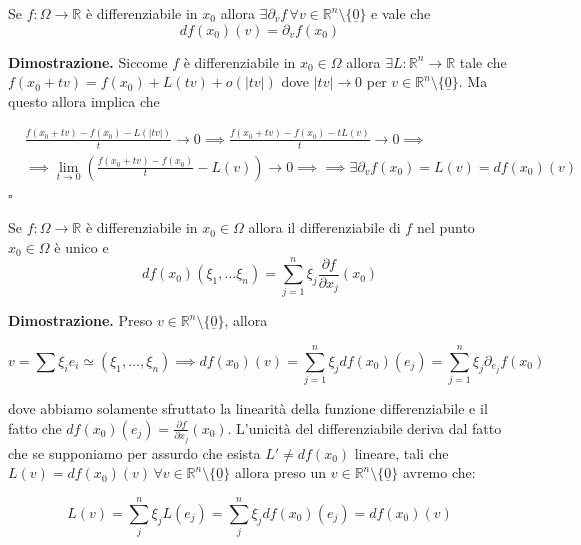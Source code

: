 \vspace{0.5cm}
\begin{theorem}[\textcolor{blue}{DF1}]
Se $f: \Omega \to \mathbb{R}$ è differenziabile in $x_0$ allora $\exists \partial_v f \, \forall v \in \mathbb{R}^n \setminus \{ \underline{0} \}$ e vale che
$$
df(x_0)(v) = \partial_v f(x_0)
$$
\label{thm:teorema_df1}
\end{theorem}

\noindent \textbf{Dimostrazione. }
Siccome $f$ è differenziabile in $x_0 \in \Omega$ allora $\exists L: \mathbb{R}^n \to \mathbb{R}$ tale che $f(x_0 + tv) = f(x_0) + L(tv) + o(|tv|)$ dove $|tv| \to 0$ per $v \in \mathbb{R}^n \setminus \{ \underline{0} \}$. Ma questo allora implica che

\[\begin{aligned}
&\frac{f(x_0 + tv) - f(x_0) - L(|tv|)}{t} \to 0 \implies \frac{f(x_0 + tv) - f(x_0) - tL(v)}{t} \to 0 \implies \\ &\implies \lim_{t \to 0} (\frac{f(x_0 + tv) - f(x_0)}{t} - L(v)) \to 0 \implies \implies \exists \partial_v f(x_0) = L(v) = df(x_0)(v)
\end{aligned}\]
\hfill $\square$

\vspace{0.5cm}
\begin{theorem}[\textcolor{blue}{rappresentazione e unicità del differenziale}]
Se $f: \Omega \to \mathbb{R}$ è differenziabile in $x_0 \in \Omega$  allora il differenziabile di $f$ nel punto $x_0 \in \Omega$ è unico e
$$
df(x_0)(\xi_1, \ldots \xi_n) = \sum_{j=1}^n \xi_j \frac{\partial f}{\partial x_j}(x_0)
$$
\end{theorem}

\noindent \textbf{Dimostrazione. }
Preso $v \in \mathbb{R}^n \setminus \{ \underline{0} \}$, allora 

\[v = \sum \xi_i e_i \simeq (\xi_1, \ldots, \xi_n) \implies df(x_0)(v) = \sum_{j = 1}^n \xi_j df(x_0)(e_j) = \sum_{j=1}^n \xi_j \partial_{e_j} f(x_0)\]

dove abbiamo solamente sfruttato la linearità della funzione differenziabile e il fatto che $df(x_0)(e_j) = \frac{\partial f}{\partial x_j}(x_0)$. L'unicità del differenziabile deriva dal fatto che se supponiamo per assurdo che esista $L' \neq df(x_0)$ lineare, tali che $L(v) = df(x_0)(v) \, \forall v \in \mathbb{R}^n \setminus \{ \underline{0} \}$ allora preso un $v \in \mathbb{R}^n \setminus \{ \underline{0} \}$ avremo che:

$$L(v) = \sum_j^n \xi_j L(e_j) = \sum_j^n \xi_j df(x_0)(e_j) = df(x_0)(v)$$

